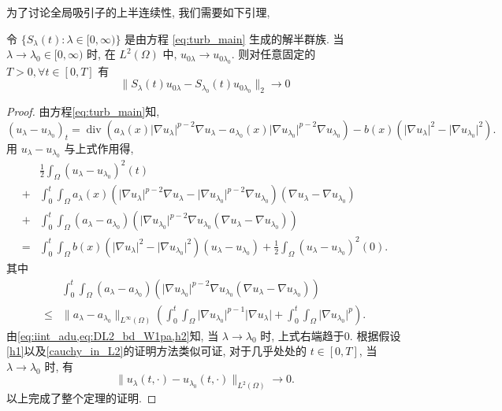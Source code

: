 \documentclass[oneside,longtitle]{LZUthesis}
\numberwithin{equation}{chapter}
\newcommand*\abs[1]{\lvert#1\rvert}
\newcommand*\norm[1]{\lVert#1\rVert}
\newcommand*\Brace[1]{\lbrace#1\rbrace}
\DeclareMathOperator{\Div}{div}
\begin{document}
为了讨论全局吸引子的上半连续性, 我们需要如下引理,
\begin{lemma}\label{lem:slambdacontinuous}
	令 $\Brace{S_\lambda(t) \colon \lambda \in [0, \infty)}$ 是由方程 \eqref{eq:turb_main} 生成的解半群族.
	当 $\lambda \to \lambda_0 \in [0, \infty)$ 时, 在 $L^2(\Omega)$ 中, $u_{0\lambda} \to u_{0\lambda_0}$.
	则对任意固定的 $T > 0, \forall t \in [0, T]$ 有
	\begin{equation*}
		\norm{S_\lambda(t)u_{0\lambda} - S_{\lambda_0}(t)u_{0\lambda_0}}_2 \to 0
	\end{equation*}
\end{lemma}
\begin{proof}
	由方程\cref{eq:turb_main}知,
	\begin{equation*}
		(u_{\lambda} - u_{\lambda_0})_t
		= \Div(a_{\lambda}(x)\abs{\nabla u_{\lambda}}^{p-2}\nabla u_{\lambda} - a_{\lambda_0}(x)\abs{\nabla u_{\lambda_0}}^{p-2}\nabla u_{\lambda_0})
		- b(x)(\abs{\nabla u_{\lambda}}^2 - \abs{\nabla u_{\lambda_0}}^2).
	\end{equation*}
	用 $u_{\lambda} - u_{\lambda_0}$ 与上式作用得,
	\begin{equation}
		\begin{split}
			& \frac{1}{2}\int_{\Omega}\left(u_{\lambda}-u_{\lambda_0}\right)^2(t)\\
			+{} & \int_{0}^{t}\int_{\Omega}a_\lambda(x)
			\left(\abs{\nabla u_{\lambda}}^{p-2}\nabla u_{\lambda}
			- \abs{\nabla u_{\lambda_0}}^{p-2}\nabla u_{\lambda_0}\right)
			\left(\nabla u_{\lambda} - \nabla u_{\lambda_0}\right)\\
			+{} & \int_{0}^{t}\int_{\Omega}(a_\lambda - a_{\lambda_0})(\abs{\nabla u_{\lambda_0}}^{p - 2}\nabla u_{\lambda_0}
			(\nabla u_{\lambda} - \nabla u_{\lambda_0})) \\
			={} & \int_{0}^{t}\int_{\Omega}b(x)\left(\abs{\nabla u_{\lambda}}^2
			- \abs{\nabla u_{\lambda_0}}^2\right)\left(u_{\lambda} - u_{\lambda_0}\right)
			+ \frac{1}{2}\int_{\Omega}\left(u_{\lambda}-u_{\lambda_0}\right)^2(0).
		\end{split}
	\end{equation}
	其中
	\begin{equation*}
		\begin{split}
			& \int_{0}^{t}\int_{\Omega}(a_\lambda - a_{\lambda_0})(\abs{\nabla u_{\lambda_0}}^{p - 2}\nabla u_{\lambda_0}
			(\nabla u_{\lambda} - \nabla u_{\lambda_0})) \\
			\leq{} & \norm{a_\lambda - a_{\lambda_0}}_{L^\infty(\Omega)}
			\left(
				\int_0^t\int_{\Omega}\abs{\nabla u_{\lambda_0}}^{p-1}\abs{\nabla u_\lambda}
				+ \int_0^t\int_{\Omega}\abs{\nabla u_{\lambda_0}}^p
			\right).
		\end{split}
	\end{equation*}
	由\cref{eq:iint_adu,eq:DL2_bd_W1pa,h2}知, 当 $\lambda \to \lambda_0$ 时, 上式右端趋于$0$.
	根据假设\cref{h1}以及\cref{cauchy_in_L2}的证明方法类似可证, 对于几乎处处的 $t \in [0, T]$, 当 $\lambda \to \lambda_0$ 时, 有
	\begin{equation}
		\norm{u_\lambda(t,\cdot)-u_{\lambda_0}(t,\cdot)}_{L^2(\Omega)} \to 0.
	\end{equation}
	以上完成了整个定理的证明.
\end{proof}
\end{document}
